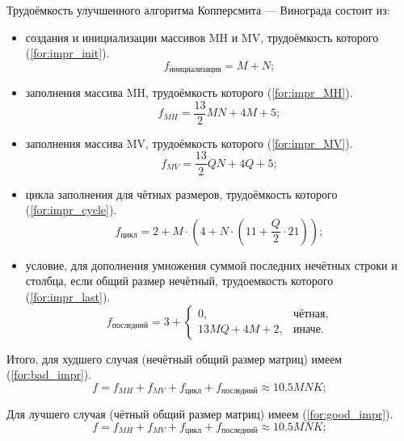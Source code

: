 Трудоёмкость улучшенного алгоритма Копперсмита — Винограда состоит из:
\begin{itemize}
	\item создания и инициализации массивов MH и MV, трудоёмкость которого (\ref{for:impr_init}).
	\begin{equation}
		\label{for:impr_init}
		f_{инициализация} = M + N;
	\end{equation}
	
	\item заполнения массива MH, трудоёмкость которого (\ref{for:impr_MH}).
	\begin{equation}
		\label{for:impr_MH}
		f_{MH} =  \frac{13}{2}MN + 4M + 5;
	\end{equation}
	
	\item заполнения массива MV, трудоёмкость которого (\ref{for:impr_MV}).
	\begin{equation}
		\label{for:impr_MV}
		f_{MV} =  \frac{13}{2}QN + 4Q + 5;
	\end{equation}
	
	\item цикла заполнения для чётных размеров, трудоёмкость которого (\ref{for:impr_cycle}).
	\begin{equation}
		\label{for:impr_cycle}
		f_{\text{цикл}} =2 + M \cdot (4 + N \cdot (11 + \frac{Q}{2} \cdot 21));
	\end{equation}
	
	\item условие, для дополнения умножения суммой последних нечётных строки и столбца, если общий размер нечётный, трудоемкость которого (\ref{for:impr_last}).
	\begin{equation}
		\label{for:impr_last}
		f_{\text{последний}} = 3 + 
		\begin{cases}
			0, & \text{чётная,}\\
			13MQ + 4M + 2, & \text{иначе.}
		\end{cases}
	\end{equation}
\end{itemize}

Итого, для худшего случая (нечётный общий размер матриц) имеем (\ref{for:bad_impr}).
\begin{equation}
	\label{for:bad_impr}
	f = f_{MH} + f_{MV} + f_{\text{цикл}} + f_{\text{последний}} \approx 10.5MNK;
\end{equation}

Для лучшего случая (чётный общий размер матриц) имеем (\ref{for:good_impr}).
\begin{equation}
	\label{for:good_impr}
	f = f_{MH} + f_{MV} + f_{\text{цикл}} + f_{\text{последний}} \approx 10.5MNK;
\end{equation}

